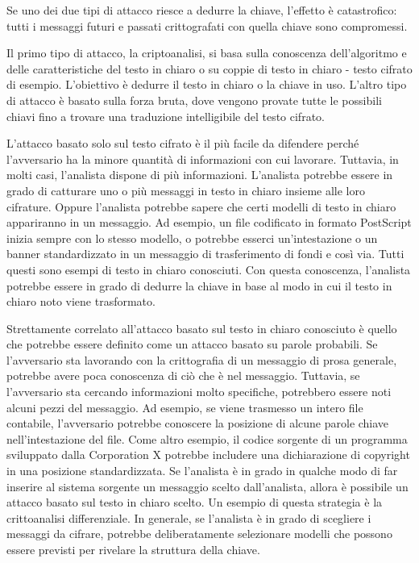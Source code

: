 Se uno dei due tipi di attacco riesce a dedurre la chiave, l'effetto è catastrofico:
tutti i messaggi futuri e passati crittografati con quella chiave sono compromessi.

Il primo tipo di attacco, la criptoanalisi, si basa sulla conoscenza dell'algoritmo
e delle caratteristiche del testo in chiaro o su coppie di testo in chiaro - testo cifrato di esempio.
L'obiettivo è dedurre il testo in chiaro o la chiave in uso. L'altro tipo di attacco è basato
sulla forza bruta, dove vengono provate tutte le possibili chiavi fino a trovare
una traduzione intelligibile del testo cifrato.

L'attacco basato solo sul testo cifrato è il più facile da difendere perché l'avversario
ha la minore quantità di informazioni con cui lavorare. Tuttavia, in molti casi,
l'analista dispone di più informazioni. L'analista potrebbe essere in grado di catturare
uno o più messaggi in testo in chiaro insieme alle loro cifrature. Oppure l'analista potrebbe
sapere che certi modelli di testo in chiaro appariranno in un messaggio. Ad esempio,
un file codificato in formato PostScript inizia sempre con lo stesso modello,
o potrebbe esserci un'intestazione o un banner standardizzato in un messaggio
di trasferimento di fondi e così via. Tutti questi sono esempi di testo in chiaro
conosciuti. Con questa conoscenza, l'analista potrebbe essere in grado di dedurre
la chiave in base al modo in cui il testo in chiaro noto viene trasformato.

Strettamente correlato all'attacco basato sul testo in chiaro conosciuto è quello
che potrebbe essere definito come un attacco basato su parole probabili.
Se l'avversario sta lavorando con la crittografia di un messaggio di prosa
generale, potrebbe avere poca conoscenza di ciò che è nel messaggio. Tuttavia,
se l'avversario sta cercando informazioni molto specifiche, potrebbero essere
noti alcuni pezzi del messaggio. Ad esempio, se viene trasmesso un intero
file contabile, l'avversario potrebbe conoscere la posizione di alcune parole
chiave nell'intestazione del file. Come altro esempio, il codice sorgente
di un programma sviluppato dalla Corporation X potrebbe includere una
dichiarazione di copyright in una posizione standardizzata. Se l'analista
è in grado in qualche modo di far inserire al sistema sorgente un messaggio
scelto dall'analista, allora è possibile un attacco basato sul testo in chiaro
scelto. Un esempio di questa strategia è la crittoanalisi differenziale.
In generale, se l'analista è in grado di scegliere i messaggi da cifrare,
potrebbe deliberatamente selezionare modelli che possono essere previsti
per rivelare la struttura della chiave.

